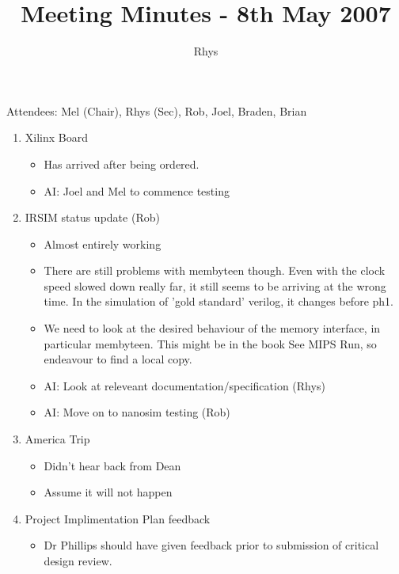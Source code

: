 \documentclass{article}
\begin{document}
\author{Rhys}
\title{Meeting Minutes - 8th May 2007}
\maketitle
\begin{flushleft}
Attendees:
Mel (Chair),
Rhys (Sec),
Rob,
Joel,
Braden,
Brian
\newline

\begin{enumerate}
  \item Xilinx Board 
    \begin{itemize}
      \item Has arrived after being ordered.
      \item AI: Joel and Mel to commence testing
    \end{itemize}
  
  \item IRSIM status update (Rob)
    \begin{itemize}
      \item Almost entirely working
      \item There are still problems with membyteen though. Even with the
            clock speed slowed down really far, it still seems to be
            arriving at the wrong time. In the simulation of 'gold standard'
            verilog, it changes before ph1.
      \item We need to look at the desired behaviour of the memory interface,
            in particular membyteen. This might be in the book See MIPS Run,
            so endeavour to find a local copy.
      \item AI: Look at releveant documentation/specification (Rhys)
      \item AI: Move on to nanosim testing (Rob)
  \end{itemize}

  \item America Trip 
    \begin{itemize}
      \item Didn't hear back from Dean 
      \item Assume it will not happen 
  \end{itemize}

  \item Project Implimentation Plan feedback
    \begin{itemize}
      \item Dr Phillips should have given feedback prior to submission of
            critical design review.
  \end{itemize}


\end{enumerate}
\end{flushleft}
\end{document}
